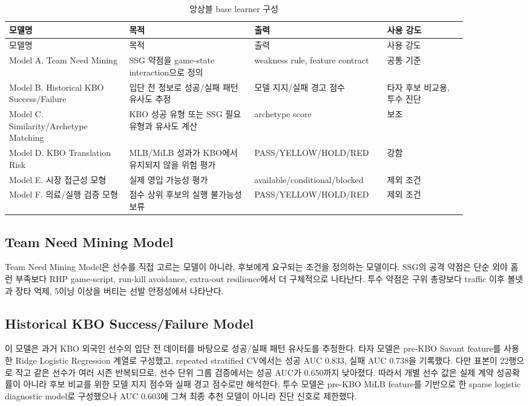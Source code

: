 \documentclass[11pt,a4paper]{article}
\begin{document}
\begin{longtable}{L{0.24\linewidth}L{0.25\linewidth}L{0.23\linewidth}L{0.16\linewidth}}
\caption{앙상블 base learner 구성}
\label{tab:model_family}\\
\toprule
모델명 & 목적 & 출력 & 사용 강도 \\
\midrule
\endfirsthead
\toprule
모델명 & 목적 & 출력 & 사용 강도 \\
\midrule
\endhead
Model A. Team Need Mining & SSG 약점을 game-state interaction으로 정의 & weakness rule, feature contract & 공통 기준 \\
Model B. Historical KBO Success/Failure & 입단 전 정보로 성공/실패 패턴 유사도 추정 & 모델 지지/실패 경고 점수 & 타자 후보 비교용, 투수 진단 \\
Model C. Similarity/Archetype Matching & KBO 성공 유형 또는 SSG 필요 유형과 유사도 계산 & archetype score & 보조 \\
Model D. KBO Translation Risk & MLB/MiLB 성과가 KBO에서 유지되지 않을 위험 평가 & PASS/YELLOW/HOLD/RED & 강함 \\
Model E. 시장 접근성 모형 & 실제 영입 가능성 평가 & available/conditional/blocked & 제외 조건 \\
Model F. 의료/실행 검증 모형 & 점수 상위 후보의 실행 불가능성 보류 & PASS/YELLOW/HOLD/RED & 제외 조건 \\
\bottomrule
\end{longtable}

\subsection{Team Need Mining Model}
Team Need Mining Model은 선수를 직접 고르는 모델이 아니라, 후보에게 요구되는 조건을 정의하는 모델이다. SSG의 공격 약점은 단순 외야 홈런 부족보다 RHP game-script, run-kill avoidance, extra-out resilience에서 더 구체적으로 나타난다. 투수 약점은 구위 총량보다 traffic 이후 볼넷과 장타 억제, 5이닝 이상을 버티는 선발 안정성에서 나타난다.

\subsection{Historical KBO Success/Failure Model}
이 모델은 과거 KBO 외국인 선수의 입단 전 데이터를 바탕으로 성공/실패 패턴 유사도를 추정한다. 타자 모델은 pre-KBO Savant feature를 사용한 Ridge Logistic Regression 계열로 구성했고, repeated stratified CV에서는 성공 AUC 0.833, 실패 AUC 0.738을 기록했다. 다만 표본이 22행으로 작고 같은 선수가 여러 시즌 반복되므로, 선수 단위 그룹 검증에서는 성공 AUC가 0.650까지 낮아졌다. 따라서 개별 선수 값은 실제 계약 성공확률이 아니라 후보 비교를 위한 모델 지지 점수와 실패 경고 점수로만 해석한다. 투수 모델은 pre-KBO MiLB feature를 기반으로 한 sparse logistic diagnostic model로 구성했으나 AUC 0.603에 그쳐 최종 추천 모델이 아니라 진단 신호로 제한했다.
\end{document}
